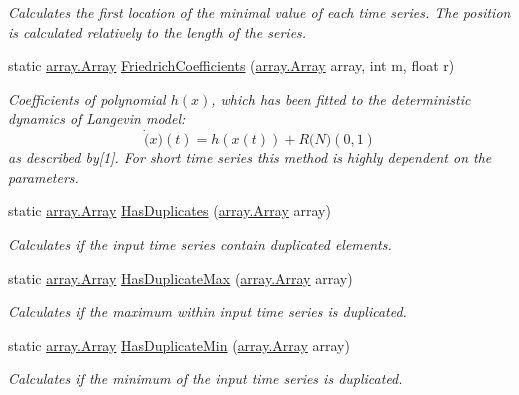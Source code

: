 \begin{DoxyCompactItemize}
\begin{DoxyCompactList}\small\item\em Calculates the first location of the minimal value of each time series. The position is calculated relatively to the length of the series. \end{DoxyCompactList}\item 
static \mbox{\hyperlink{classkhiva_1_1array_1_1_array}{array.\+Array}} \mbox{\hyperlink{classkhiva_1_1features_1_1_features_a7b79a95ce1b07a35884a41abb3b4248f}{Friedrich\+Coefficients}} (\mbox{\hyperlink{classkhiva_1_1array_1_1_array}{array.\+Array}} array, int m, float r)
\begin{DoxyCompactList}\small\item\em Coefficients of polynomial $h(x)$, which has been fitted to the deterministic dynamics of Langevin model\+: \[ \dot(x)(t) = h(x(t)) + R \mathcal(N)(0,1) \] as described by\mbox{[}1\mbox{]}. For short time series this method is highly dependent on the parameters. \end{DoxyCompactList}\item 
static \mbox{\hyperlink{classkhiva_1_1array_1_1_array}{array.\+Array}} \mbox{\hyperlink{classkhiva_1_1features_1_1_features_ab7e5472a6a67a3d7116c278a98a82545}{Has\+Duplicates}} (\mbox{\hyperlink{classkhiva_1_1array_1_1_array}{array.\+Array}} array)
\begin{DoxyCompactList}\small\item\em Calculates if the input time series contain duplicated elements. \end{DoxyCompactList}\item 
static \mbox{\hyperlink{classkhiva_1_1array_1_1_array}{array.\+Array}} \mbox{\hyperlink{classkhiva_1_1features_1_1_features_a27d4abe4e9c83930ccec3278338e2b52}{Has\+Duplicate\+Max}} (\mbox{\hyperlink{classkhiva_1_1array_1_1_array}{array.\+Array}} array)
\begin{DoxyCompactList}\small\item\em Calculates if the maximum within input time series is duplicated. \end{DoxyCompactList}\item 
static \mbox{\hyperlink{classkhiva_1_1array_1_1_array}{array.\+Array}} \mbox{\hyperlink{classkhiva_1_1features_1_1_features_a1c89f58b3851d06f57635ef4abbb0293}{Has\+Duplicate\+Min}} (\mbox{\hyperlink{classkhiva_1_1array_1_1_array}{array.\+Array}} array)
\begin{DoxyCompactList}\small\item\em Calculates if the minimum of the input time series is duplicated. \end{DoxyCompactList}\item 

\end{DoxyCompactItemize}
